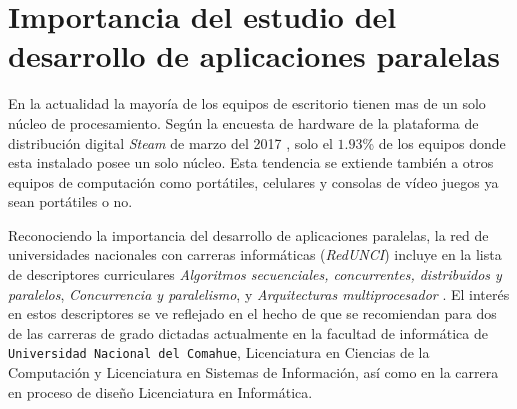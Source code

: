 
\section{Importancia del estudio del desarrollo de aplicaciones paralelas}

En la actualidad la mayoría de los equipos de escritorio tienen mas de un solo
núcleo de procesamiento. Según la encuesta de hardware de la plataforma de
distribución digital \emph{Steam} de marzo del 2017 \cite{steamSurvey}, solo
el $1.93$\% de los equipos donde esta instalado posee un solo núcleo. Esta
tendencia se extiende también a otros equipos de computación como portátiles,
celulares y consolas de vídeo juegos ya sean portátiles o no.

Reconociendo la importancia del desarrollo de aplicaciones paralelas, la red
de universidades nacionales con carreras informáticas (\emph{RedUNCI}) incluye
en la lista de descriptores curriculares \emph{Algoritmos secuenciales,
concurrentes, distribuidos y paralelos}, \emph{Concurrencia y paralelismo}, y
\emph{Arquitecturas multiprocesador} \cite{RedUNCI2015}. El interés en estos
descriptores se ve reflejado en el hecho de que se recomiendan para dos de las
carreras de grado dictadas actualmente en la facultad de informática de
\texttt{Universidad Nacional del Comahue}, Licenciatura en Ciencias de la
Computación y Licenciatura en Sistemas de Información, así como en la carrera
en proceso de diseño Licenciatura en Informática.
